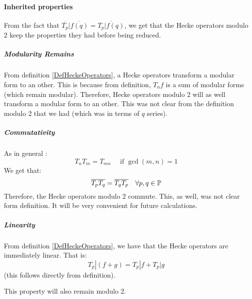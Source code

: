 \paragraph{Inherited properties}
From the fact that $\overline{T_p}|\overline{f(q)} = \overline{T_p|f(q)}$, we get that the Hecke operators modulo 2 keep the properties they had before being reduced.
\subparagraph{Modularity Remains}
\label{HekeModular}
From definition \ref{DefHeckeOperators}, a Hecke operators transform a modular form to an other.
This is because from definition, $T_nf$ is a sum of modular forms (which remain modular).
Therefore, Hecke operators modulo 2 will as well transform a modular form to an other.
This was not clear from the definition modulo 2 that we had (which was in terms of $q$ series).
\subparagraph{Commutativity}
\label{HekeCommute}
As in general \cite[p.101]{CourseInArithmetic}:
$$
T_nT_m = T_{mn} \quad \text{ if } \gcd(m,n)=1
$$
We get that:
$$
\overline{T_p}\overline{T_q} = \overline{T_q}\overline{T_p} \quad \forall p,q \in \mathbb{P}
$$
Therefore, the Hecke operators modulo 2 commute.
This, as well, was not clear form definition.
It will be very convenient for future calculations.
\subparagraph{Linearity}
\label{HekeLinear}
From definition \ref{DefHeckeOperators}, we have that the Hecke operators are immediately linear.
That is:
$$
T_p|(f+g) = T_p|f + T_p|g
$$
(this follows directly from definition).

This property will also remain modulo 2.

